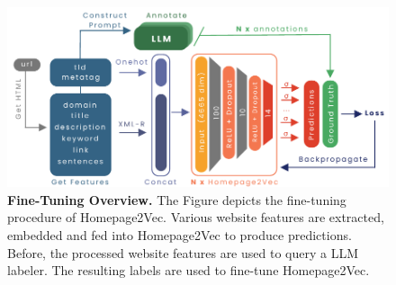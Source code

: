 \begin{figure}[!ht]
    \centering
    \includegraphics[height=0.2\textheight, width=\columnwidth]{./figures/training_overview.pdf}
    \caption{\textbf{Fine-Tuning Overview.} The Figure depicts the fine-tuning procedure of Homepage2Vec. Various website features are extracted, embedded and fed into Homepage2Vec to produce predictions. Before, the processed website features are used to query a LLM labeler. The resulting labels are used to fine-tune Homepage2Vec.}
    \label{fig:train-overview}
\end{figure}

